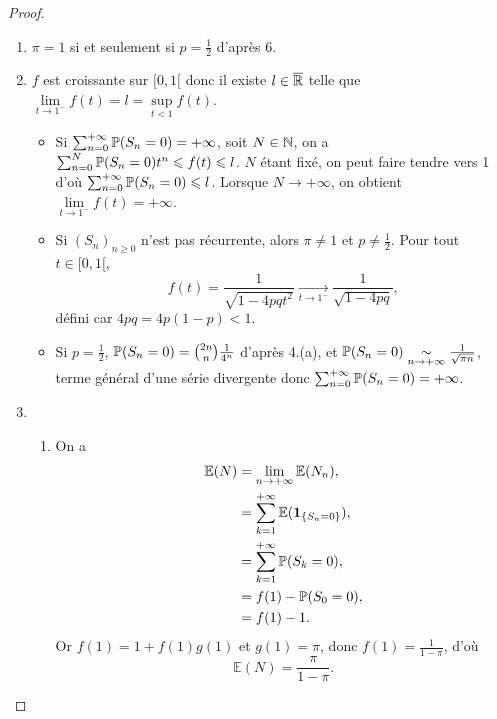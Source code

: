 \documentclass[12pt]{article}
\begin{document}
\begin{proof}
\begin{enumerate}
        \item $\pi=1$ si et seulement si $p=\frac{1}{2}$ d'après 6.
        
        \item $f$ est croissante sur $[0,1[$ donc il existe $l\in\overline{\R}$ telle que $\lim\limits_{t\to1^{-}}f(t)=l=\sup\limits_{t<1}f(t)$.
        
        \begin{itemize}
            \item Si $\sum_{n=0}^{+\infty}\P(S_n=0)=+\infty$, soit $N\in\N$, on a $\sum_{n=0}^{N}\P(S_n=0)t^{n}\leqslant f(t)\leqslant l$. $N$ étant fixé, on peut faire tendre vers 1 d'où $\sum_{n=0}^{+\infty}\P(S_n=0)\leqslant l$. Lorsque $N\to+\infty$, on obtient $\lim\limits_{t\to1^{-}}f(t)=+\infty$.
            
            \item Si $(S_n)_{n\geqslant0}$ n'est pas récurrente, alors $\pi\neq1$ et $p\neq\frac{1}{2}$. Pour tout $t\in[0,1[$,
            \begin{equation}
                f(t)=\frac{1}{\sqrt{1-4pqt^{2}}}\xrightarrow[t\to1^{-}]{}\frac{1}{\sqrt{1-4pq}},
            \end{equation}
            défini car $4pq=4p(1-p)<1$.

            \item Si $p=\frac{1}{2}$, $\P(S_n=0)=\binom{2n}{n}\frac{1}{4^{n}}$ d'après 4.(a), et $\P(S_n=0)\underset{n\to+\infty}{\sim}\frac{1}{\sqrt{\pi n}}$, terme général d'une série divergente donc $\sum_{n=0}^{+\infty}\P(S_n=0)=+\infty$.
        \end{itemize}

        \item 
        \begin{enumerate}
            \item On a 
            \begin{align}
                \mathbb{E}(N)
                &=\lim\limits_{n\to+\infty}\mathbb{E}(N_n),\\
                &=\sum_{k=1}^{+\infty}\mathbb{E}(\mathbf{1}_{\left\lbrace S_n=0\right\rbrace}),\\
                &=\sum_{k=1}^{+\infty}\P(S_k=0),\\
                &=f(1)-\P(S_0=0),\\
                &=f(1)-1.
            \end{align}
            Or $f(1)=1+f(1)g(1)$ et $g(1)=\pi$, donc $f(1)=\frac{1}{1-\pi}$, d'où 
            \begin{equation}
                \mathbb{E}(N)=\frac{\pi}{1-\pi}.
            \end{equation}


\end{enumerate}
\end{enumerate}
\end{proof}
\end{document}
